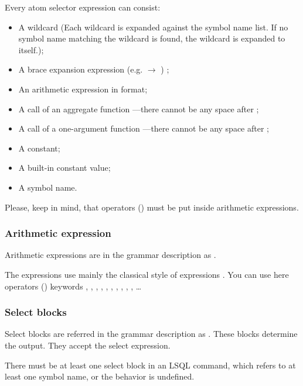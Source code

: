 Every atom selector expression can consist:
\begin{itemize}
    \item A wildcard (Each wildcard is expanded against the symbol name list.
	    If no symbol name matching the wildcard is found, the wildcard is expanded to itself.);
    \item A  brace expansion expression (e.g.  $\rightarrow$ ) \cite{bash-reference-manual};
    \item An arithmetic expression in  format;
    \item A call of an aggregate function ---\allowbreak{}the\-re cannot be any space after ;
    \item A call of a one-argument function ---there cannot be any space after ;
    \item A constant;
    \item A built-in constant value;
    \item A symbol name.
\end{itemize}

Please, keep in mind, that operators () must be put inside arithmetic expressions.

\subsubsection{Arithmetic expression}
Arithmetic expressions are in the grammar description as .

The expressions use mainly the classical  style of expressions \cite{awk-reference-manual}.  
You can use here operators () keywords \icode{\textgreater}, \icode{\textless}, \icode{\textless=}, \icode{\textgreater=}, \icode{==}, \icode{$\vert\vert$}, \icode{\&\&}, \icode{+}, \icode{-}, \icode{*}, \icode{/}\ldots{}

\subsubsection{Select blocks}
Select blocks are referred in the grammar description as .
These blocks determine the output. They accept the select expression.

There must be at least one select block in an LSQL command, which refers to at least one symbol name, or the behavior is undefined.

